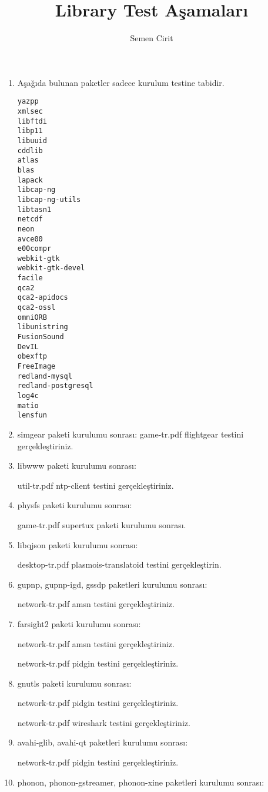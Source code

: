 \documentclass[a4paper,10pt]{article}
\title{Library Test Aşamaları}
\author{Semen Cirit}
\begin{document}
\maketitle
\begin{enumerate}
\item Aşağıda bulunan paketler sadece kurulum testine tabidir.
\begin{verbatim}
yazpp
xmlsec
libftdi
libp11
libuuid
cddlib
atlas
blas
lapack
libcap-ng
libcap-ng-utils
libtasn1
netcdf
neon
avce00
e00compr
webkit-gtk
webkit-gtk-devel
facile
qca2
qca2-apidocs
qca2-ossl
omniORB
libunistring
FusionSound
DevIL
obexftp
FreeImage
redland-mysql
redland-postgresql
log4c
matio
lensfun
\end{verbatim}
\item simgear paketi kurulumu sonrası:
game-tr.pdf flightgear testini gerçekleştiriniz.

\item libwww paketi kurulumu sonrası:

util-tr.pdf ntp-client testini gerçekleştiriniz.

\item physfs paketi kurulumu sonrası:

game-tr.pdf supertux paketi kurulumu sonrası.

\item libqjson paketi kurulumu sonrası:

desktop-tr.pdf plasmois-translatoid testini gerçekleştirin.

\item gupnp, gupnp-igd, gssdp paketleri kurulumu sonrası:

network-tr.pdf amsn testini gerçekleştiriniz.

\item farsight2 paketi kurulumu sonrası:

network-tr.pdf amsn testini gerçekleştiriniz.

network-tr.pdf pidgin testini gerçekleştiriniz.

\item gnutls paketi kurulumu sonrası:

network-tr.pdf pidgin testini gerçekleştiriniz.

network-tr.pdf wireshark testini gerçekleştiriniz.

\item avahi-glib, avahi-qt paketleri kurulumu sonrası:

network-tr.pdf pidgin testini gerçekleştiriniz.

\item phonon, phonon-gstreamer, phonon-xine paketleri kurulumu sonrası:


\end{enumerate}
\end{document}
